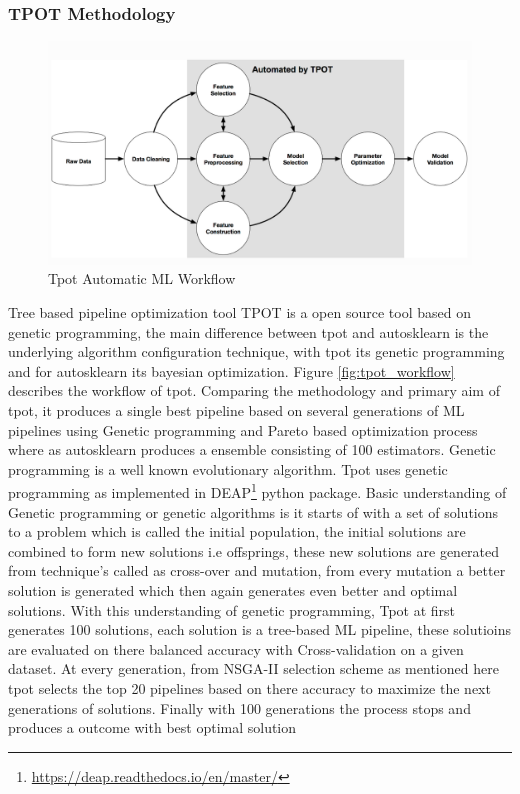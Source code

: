    
\subsubsection{TPOT Methodology}
    
    \begin{figure}[!h]
    	\centering
    	\includegraphics[width=1.1\linewidth]{thesis_template/images/tpot-git-workflow.png}
    	\caption{Tpot Automatic ML Workflow}
    	\label{fig:tpot_git_workflow}
    \end{figure}
Tree based pipeline optimization tool TPOT\cite{tpot} is a open source tool based on genetic programming, the main difference between tpot and autosklearn is the underlying algorithm configuration technique, with tpot its genetic programming and for autosklearn its bayesian optimization. Figure \ref{fig:tpot_workflow} describes the workflow of tpot. Comparing the methodology and primary aim of tpot, it produces a single best pipeline based on several generations of ML pipelines using Genetic programming and Pareto based optimization process where as autosklearn produces a ensemble consisting of 100 estimators.
Genetic programming is a well known evolutionary algorithm. Tpot uses genetic programming as implemented in DEAP\footnote{\url{https://deap.readthedocs.io/en/master/}} python package. Basic understanding of Genetic programming or genetic algorithms is  it starts of with a set of solutions to a problem which is called the initial population, the initial solutions are combined to form new solutions i.e offsprings, these new solutions are generated from technique's called as cross-over and mutation, from every mutation a better solution is generated which then again generates even better and optimal solutions. With this understanding of genetic programming, Tpot at first generates 100 solutions, each solution is a tree-based ML pipeline, these solutioins are evaluated on there balanced accuracy with Cross-validation on a given dataset. At every generation, from NSGA-II selection scheme as mentioned here\cite{tpot} tpot selects the top 20 pipelines based on there accuracy to maximize the next generations of solutions. Finally with 100 generations the process stops and produces a outcome with best optimal solution 
        

